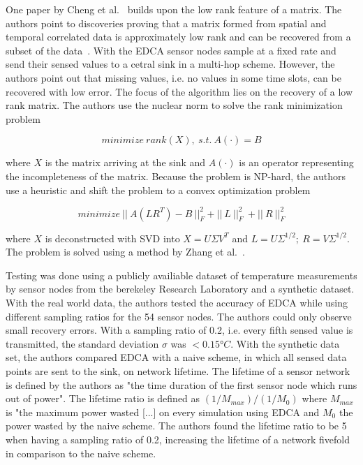 \par

One paper by Cheng et al.~\cite{cheng2010efficient} builds upon the low rank
feature of a matrix. The authors point to discoveries proving that a matrix
formed from spatial and temporal correlated data is approximately low rank and
can be recovered from a subset of the data~\cite{vuran2004spatio,
candes2009exact}. With the \ac{EDCA} sensor nodes sample at a fixed rate and
send their sensed values to a cetral sink in a multi-hop scheme. However, the
authors point out that missing values, i.e. no values in some time slots, can
be recovered with low error. The focus of the algorithm lies on the recovery of
a low rank
matrix. The authors use the nuclear norm to solve the rank minimization problem

$$
minimize \ rank(X), \ s.t. \ A(\cdot)=B
$$

where $ X $ is the matrix arriving at the sink and $ A(\cdot) $ is an operator
representing the incompleteness of the matrix. Because the problem is NP-hard,
the authors use a heuristic and shift the problem to a convex optimization
problem

$$
minimize \ || \ A(LR^T) - B \ ||^2_F + || \ L \ ||^2_F \ + || \ R \ ||^2_F
$$

where $ X $ is deconstructed with \ac{SVD} into $ X = U \Sigma V^T $ and $ L =
U\Sigma^{1/2}; \ R = V\Sigma^{1/2}$. The problem is solved using a method by
Zhang et al.~\cite{zhang2009spatio}.

Testing was done using a publicly availiable dataset of temperature
measurements by sensor nodes from the berekeley Research Laboratory and a
synthetic dataset. With the real world data, the authors tested the accuracy of
\ac{EDCA} while using different sampling ratios for the 54 sensor nodes. The
authors could only observe small recovery errors. With a sampling ratio of 0.2,
i.e. every fifth sensed value is transmitted, the standard deviation $ \sigma $
was $ < 0.15°C $. %
With the synthetic data set, the authors compared \ac{EDCA}
with a naive scheme, in which all sensed data points are sent to the sink, on
network lifetime. The lifetime of a sensor network is defined by the authors as
"the time duration of the first sensor node which runs out of power". The
lifetime ratio is defined as $ (1/M_{max}) / (1/M_0) $ where $ M_{max} $ is
"the maximum power wasted [...] on every simulation using \ac{EDCA} and $ M_0 $
the power wasted by the naive scheme. The authors found the lifetime ratio to
be 5 when having a sampling ratio of 0.2, increasing the lifetime of a network
fivefold in comparison to the naive scheme.


